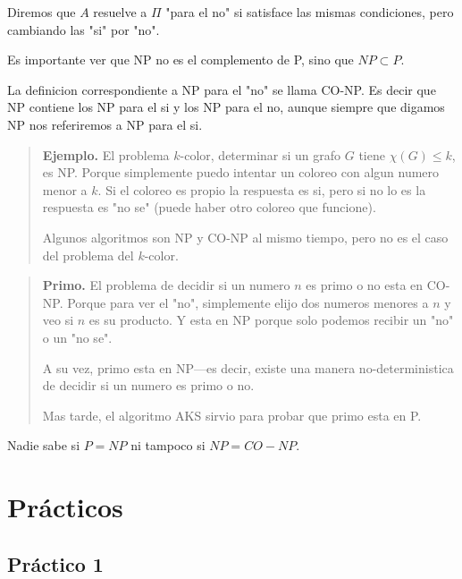 \documentclass[a4paper]{article}
\begin{document}
Diremos que $A$ resuelve a $\Pi$ "para el no" si satisface las mismas 
condiciones, pero cambiando las "si" por "no".

Es importante ver que NP no es el complemento de P, sino que $NP \subset P$.

La definicion correspondiente a NP para el "no" se llama CO-NP. Es decir que NP
contiene los NP para el si y los NP para el no, aunque siempre que
digamos NP nos referiremos a NP para el si.


\small
\begin{quote}

\textbf{Ejemplo.} El problema $k$-color, determinar si un grafo $G$ tiene
$\chi(G) \leq k$, es NP. Porque simplemente puedo intentar un 
coloreo con algun numero menor a $k$. Si el coloreo es propio 
la respuesta es si, pero si no lo es la respuesta es "no se"
(puede haber otro coloreo que funcione). 

Algunos algoritmos son NP y CO-NP al mismo tiempo, pero no es el caso 
del problema del $k$-color.

\end{quote}
\normalsize


\small
\begin{quote}

\textbf{Primo.} El problema de decidir si un numero $n$ es primo o no esta en CO-NP. 
Porque para ver el "no", simplemente elijo dos numeros menores a $n$ y veo 
si $n$ es su producto. Y esta en NP porque solo podemos recibir un "no" 
o un "no se".

A su vez, primo esta en NP---es decir, existe una manera no-deterministica de
decidir si un numero es primo o no.

Mas tarde, el algoritmo AKS sirvio para probar que primo esta en P.

\end{quote}
\normalsize

Nadie sabe si $P = NP$ ni tampoco si $NP = CO-NP$.









\pagebreak




\section{Prácticos}

\subsection{Práctico 1}
\end{document}
